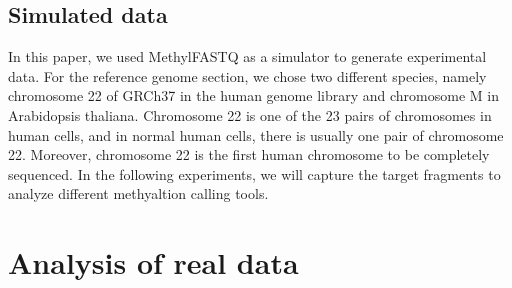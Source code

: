 \documentclass{PHlab-thesis}
\begin{document}
\subsection{Simulated data}
In this paper, we used MethylFASTQ as a simulator to generate experimental data. For the reference genome section, we chose two different species, namely chromosome 22 of GRCh37 in the human genome library and chromosome M in Arabidopsis thaliana. Chromosome 22 is one of the 23 pairs of chromosomes in human cells, and in normal human cells, there is usually one pair of chromosome 22. Moreover, chromosome 22 is the first human chromosome to be completely sequenced. In the following experiments, we will capture the target fragments to analyze different methyaltion calling tools.





\section{Analysis of real data}
\end{document}
